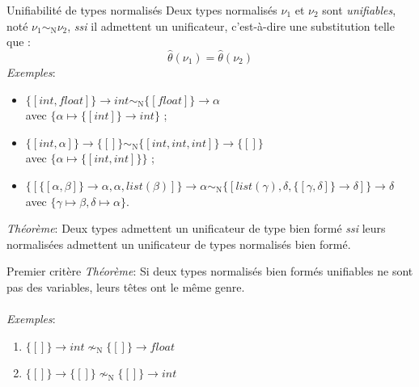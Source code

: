 \documentclass[serif]{beamer}
\newcommand{\exemples}{\textit{Exemples}\xspace}
\newcommand{\theoreme}{\textit{Théorème}\xspace}
\newcommand{\mset}[1]{\{\![#1]\!\}}
\newcommand{\ssi}{\textit{ssi}\xspace}
\newcommand{\N}{\mathrm{N}}
\begin{document}
\begin{frame}{Unifiabilité de types normalisés}
\footnotesize
Deux types normalisés $\nu_1$ et $\nu_2$ sont \emph{unifiables}, noté $\nu_1 \sim_\N \nu_2$, \ssi il admettent un unificateur, c'est-à-dire une substitution telle que :
\[ \hat\theta (\nu_1) = \hat\theta (\nu_2) \]
\exemples :
\begin{itemize}
	\item $\mset{int, float} \rightarrow int \sim_\N \mset{float} \rightarrow \alpha$ \\ avec $\{ \alpha \mapsto \mset{int} \rightarrow int \}$ ;
	\item $\mset{int, \alpha} \rightarrow \mset{} \sim_\N \mset{int, int, int} \rightarrow \mset{}$ \\ avec $\{ \alpha \mapsto \mset{int, int} \}$ ;
	\item $\mset{\mset{\alpha, \beta} \rightarrow \alpha, \alpha, list (\beta)} \rightarrow \alpha \sim_\N \mset{list (\gamma), \delta, \mset{\gamma, \delta} \rightarrow \delta} \rightarrow \delta$ \\ avec $\{ \gamma \mapsto \beta, \delta \mapsto \alpha \}$.
\end{itemize}
\bigskip
\theoreme : Deux types admettent un unificateur de type bien formé \ssi leurs normalisées admettent un unificateur de types normalisés bien formé.
\end{frame}


\begin{frame}{Premier critère}
\small
\theoreme : Si deux types normalisés bien formés unifiables ne sont pas des variables, leurs têtes ont le même genre.
\\~\\
\exemples :
\begin{enumerate}
	\item $\mset{} \rightarrow int \nsim_\N \mset{} \rightarrow float$
	\item $\mset{} \rightarrow \mset{} \nsim_\N \mset{} \rightarrow int$
\end{enumerate}
\end{frame}

\end{document}
